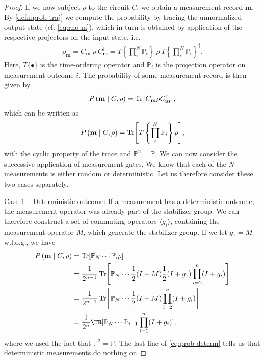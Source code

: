 \begin{proof}
If we now subject $\rho$ to the circuit $C$, we obtain a measurement record
$\mathbf{m}$. By \cref{defn:prob-traj} we compute the probability by tracing the
unnormalized output state (cf. \cref{eq:rho-m}), which in turn is obtained by application
of the respective projectors on the input state, i.e.
\begin{align}
  \rho_\mathbf{m} = C_\mathbf{m}\ \rho \ C_\mathbf{m}^\dagger 
  = T\left\{\prod_i^N\mathbb{P_i}\right\}\ \rho \ T\left\{\prod_i^N\mathbb{P_i}\right\}^\dagger 
.\end{align}
Here, $T\{\bullet\}$ is the time-ordering operator and $\mathbb{P}_i$ is the
projection operator on measurement outcome $i$. The probability of some
measurement record is then given by
\begin{align}
  P\left(\mathbf{m} \mid C, \rho\right) = \Tr[C_\mathbf{m} \rho
  C_\mathbf{m}^\dagger]
,\end{align}
which can be written as
\begin{align}
  P\left(\mathbf{m} \mid C, \rho\right) = \Tr[T\left\{\prod_i^N
  \mathbb{P}_i\right\}\rho]
,\end{align}
with the cyclic property of the trace and $\mathbb{P}^2 = \mathbb{P}$.
We can now consider the successive application of measurement gates.
We know that each of the $N$ measurements is either random or deterministic.
Let us therefore consider these two cases separately.
\par{Case 1 -- Deterministic outcome:}
If a measurement has a deterministic outcome, the measurement operator was
already part of the stabilizer group. We can therefore construct a set of
commuting operators $\langle g_i\rangle$, containing the measurement operator
$M$, which generate the
stabilizer group. If we let $g_1=M$ w.l.o.g., we have
\begin{align}
  P\left(\mathbf{m} \mid C, \rho\right) 
  &= \Tr[ \mathbb{P}_N \cdots \mathbb{P}_i \rho ] \nonumber\\
  &= \frac{1}{2^{n-1}}\Tr[\mathbb{P}_N \cdots \frac{1}{2} (I + M)\frac{1}{2} (I + g_1)
  \prod_{i=2}^n (I + g_i)] \nonumber\\
  &= \frac{1}{2^{n-1}}\Tr[\mathbb{P}_N\cdots \frac{1}{2}(I+M) \prod_{i=2}^n (I+g_i)] \nonumber\\
  &= \frac{1}{2^n}\TR[\mathbb{P}_N\cdots \mathbb{P}_{i+1} \prod_{i=1}^n
  (I+g_i)] \label{eq:prob-determ}
,\end{align}
where we used the fact that $\mathbb{P}^2 =\mathbb{P}$. The last line of
\cref{eq:prob-determ} tells us that deterministic measurements do nothing on

\end{proof}
